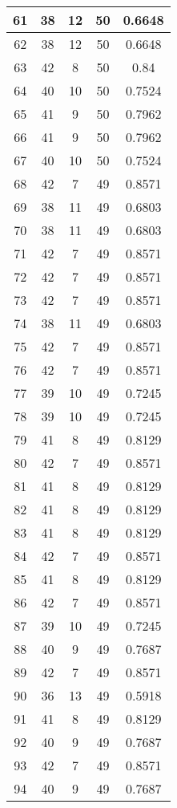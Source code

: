 \documentclass[letterpaper, 12pt]{article}
\begin{document}
\begin{longtable}{|c|c|c|c|c|}
\hline
61 & 38 & 12 & 50 & 0.6648 \\
\hline
62 & 38 & 12 & 50 & 0.6648 \\
\hline
63 & 42 & 8 & 50 & 0.84 \\
\hline
64 & 40 & 10 & 50 & 0.7524 \\
\hline
65 & 41 & 9 & 50 & 0.7962 \\
\hline
66 & 41 & 9 & 50 & 0.7962 \\
\hline
67 & 40 & 10 & 50 & 0.7524 \\
\hline
68 & 42 & 7 & 49 & 0.8571 \\
\hline
69 & 38 & 11 & 49 & 0.6803 \\
\hline
70 & 38 & 11 & 49 & 0.6803 \\
\hline
71 & 42 & 7 & 49 & 0.8571 \\
\hline
72 & 42 & 7 & 49 & 0.8571 \\
\hline
73 & 42 & 7 & 49 & 0.8571 \\
\hline
74 & 38 & 11 & 49 & 0.6803 \\
\hline
75 & 42 & 7 & 49 & 0.8571 \\
\hline
76 & 42 & 7 & 49 & 0.8571 \\
\hline
77 & 39 & 10 & 49 & 0.7245 \\
\hline
78 & 39 & 10 & 49 & 0.7245 \\
\hline
79 & 41 & 8 & 49 & 0.8129 \\
\hline
80 & 42 & 7 & 49 & 0.8571 \\
\hline
81 & 41 & 8 & 49 & 0.8129 \\
\hline
82 & 41 & 8 & 49 & 0.8129 \\
\hline
83 & 41 & 8 & 49 & 0.8129 \\
\hline
84 & 42 & 7 & 49 & 0.8571 \\
\hline
85 & 41 & 8 & 49 & 0.8129 \\
\hline
86 & 42 & 7 & 49 & 0.8571 \\
\hline
87 & 39 & 10 & 49 & 0.7245 \\
\hline
88 & 40 & 9 & 49 & 0.7687 \\
\hline
89 & 42 & 7 & 49 & 0.8571 \\
\hline
90 & 36 & 13 & 49 & 0.5918 \\
\hline
91 & 41 & 8 & 49 & 0.8129 \\
\hline
92 & 40 & 9 & 49 & 0.7687 \\
\hline
93 & 42 & 7 & 49 & 0.8571 \\
\hline
94 & 40 & 9 & 49 & 0.7687 \\
\hline

\end{longtable}
\end{document}
